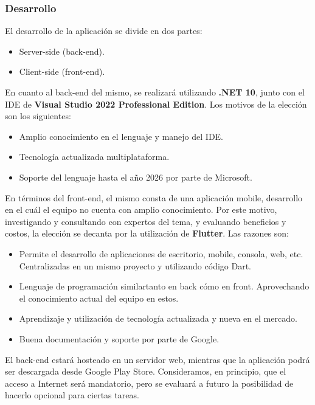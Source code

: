 \documentclass[a4paper,12pt]{article}
\begin{document}
    \subsubsection{Desarrollo}
    \par El desarrollo de la aplicación se divide en dos partes:
    \begin{itemize}
        \item Server-side (back-end).
        \item Client-side (front-end).
    \end{itemize}
    \par En cuanto al back-end del mismo, se realizará utilizando \textbf{.NET 10}, junto con el IDE de \textbf{Visual Studio 2022 Professional Edition}. Los motivos de la elección son los siguientes:
    \begin{itemize}
        \item Amplio conocimiento en el lenguaje y manejo del IDE.
        \item Tecnología actualizada multiplataforma.
        \item Soporte del lenguaje hasta el año 2026 por parte de Microsoft.
    \end{itemize}
    \par En términos del front-end, el mismo consta de una aplicación mobile, desarrollo en el cuál el equipo no cuenta con amplio conocimiento. Por este motivo, investigando y consultando con expertos del tema, y evaluando beneficios y costos, la elección se decanta por la utilización de \textbf{Flutter}. Las razones son:
    \begin{itemize}
        \item Permite el desarrollo de aplicaciones de escritorio, mobile, consola, web, etc. Centralizadas en un mismo proyecto y utilizando código Dart.
        \item Lenguaje de programación similartanto en back cómo en front. Aprovechando el conocimiento actual del equipo en estos.
        \item Aprendizaje y utilización de tecnología actualizada y nueva en el mercado.
        \item Buena documentación y soporte por parte de Google.
    \end{itemize}
    \par El back-end estará hosteado en un servidor web, mientras que la aplicación podrá ser descargada desde Google Play Store. Consideramos, en principio, que el acceso a Internet será mandatorio, pero se evaluará a futuro la posibilidad de hacerlo opcional para ciertas tareas.
\end{document}
